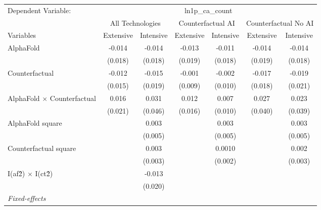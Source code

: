 \begingroup
\centering
\begin{tabular}{lcccccc}
   \tabularnewline \midrule \midrule
   Dependent Variable: & \multicolumn{6}{c}{ln1p\_ca\_count}\\
 & \multicolumn{2}{c}{All Technologies} & \multicolumn{2}{c}{Counterfactual AI} & \multicolumn{2}{c}{Counterfactual No AI} \\
\cmidrule(lr){1-1}\cmidrule(lr){2-3} \cmidrule(lr){4-5} \cmidrule(lr){6-7}
Variables & \multicolumn{1}{c}{Extensive} & \multicolumn{1}{c}{Intensive} & \multicolumn{1}{c}{Extensive} & \multicolumn{1}{c}{Intensive} & \multicolumn{1}{c}{Extensive} & \multicolumn{1}{c}{Intensive} \\
\cmidrule(lr){1-1}\cmidrule(lr){2-2} \cmidrule(lr){3-3} \cmidrule(lr){4-4} \cmidrule(lr){5-5} \cmidrule(lr){6-6} \cmidrule(lr){7-7}
   AlphaFold                          & -0.014  & -0.014  & -0.013  & -0.011  & -0.014  & -0.014\\   
                                      & (0.018) & (0.018) & (0.019) & (0.018) & (0.019) & (0.018)\\   
   Counterfactual                     & -0.012  & -0.015  & -0.001  & -0.002  & -0.017  & -0.019\\   
                                      & (0.015) & (0.019) & (0.009) & (0.010) & (0.018) & (0.021)\\   
   AlphaFold $\times$ Counterfactual  & 0.016   & 0.031   & 0.012   & 0.007   & 0.027   & 0.023\\   
                                      & (0.021) & (0.046) & (0.016) & (0.010) & (0.040) & (0.039)\\   
   AlphaFold square                   &         & 0.003   &         & 0.003   &         & 0.003\\   
                                      &         & (0.005) &         & (0.005) &         & (0.005)\\   
   Counterfactual square              &         & 0.003   &         & 0.0010  &         & 0.002\\   
                                      &         & (0.003) &         & (0.002) &         & (0.003)\\   
   I(af\^2) $\times$ I(ct\^2)         &         & -0.013  &         &         &         &   \\   
                                      &         & (0.020) &         &         &         &   \\   
   \midrule
   \emph{Fixed-effects}\\

\end{tabular}
